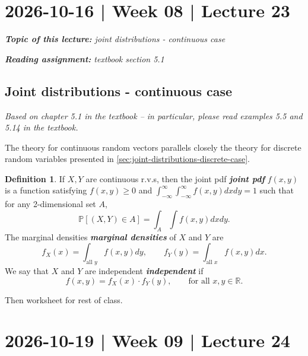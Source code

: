 \documentclass[10pt]{article}
\theoremstyle{definition}
\newtheorem{definition}[theorem]{Definition}
\newcommand{\1}[1]{\textbf{1}_{\left[#1\right]}} %
\def\R{\mathbb{R}} %
\def\P{\mathbb{P}} %
\DeclareRobustCommand{\demph}[1]{%
  \ifmmode
  {\color{Blue}#1}%
  \else
  {\color{Blue}\bfseries\slshape #1}%
  \fi
}
\begin{document}
\section{2026-10-16 | Week 08 | Lecture 23}
\begin{center}
  \begin{tcolorbox}[width=0.9\textwidth, colback=white, colframe=black]
    \textit{\textbf{Topic of this lecture:} joint distributions - continuous case}

    \textit{\textbf{Reading assignment:} textbook section 5.1}
  \end{tcolorbox}
\end{center}

\subsection{Joint distributions - continuous case}

\textit{Based on chapter 5.1 in the textbook -- in particular, please read
  examples 5.5 and 5.14 in the textbook.}

The theory for continuous random vectors parallels closely the theory for
discrete random variables presented in \cref{sec:joint-distributions-discrete-case}.

\begin{definition}
  If $X,Y$ are continuous r.v.s, then the \demph{joint pdf} $f(x,y)$ is a
  function satisfying $f(x,y) \geq 0$ and
  $\int_{-\infty }^{\infty}\int_{-\infty}^{\infty}f(x,y)dxdy=1$ such that for
  any 2-dimensional set $A$,
  \begin{equation*}
    \P\left[(X,Y)\in A \right] = \int_{A}\int f(x,y)dxdy.
  \end{equation*}
  The \demph{marginal densities} of $X$ and $Y$ are
  \begin{equation*}
    f_{X}(x) = \int_{\text{all }y} f(x,y)dy, \qquad  f_{Y}(y) = \int_{\text{all }x} f(x,y)dx.
  \end{equation*}
  We say that $X$ and $Y$ are \demph{independent} if
  \begin{equation*}
    f(x,y) = f_{X}(x)\cdot f_{Y}(y), \qquad \text{for all }x,y\in \R.
  \end{equation*}
\end{definition}

Then worksheet for rest of class.

\newpage
\section{2026-10-19 | Week 09 | Lecture 24}
\end{document}
